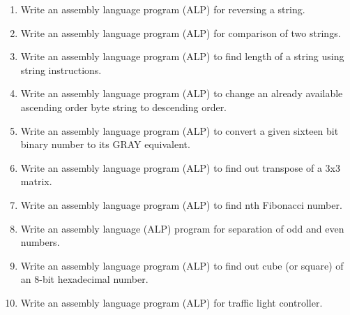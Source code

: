\documentclass[12pt, a4paper]{scrartcl}
\begin{document}
\begin{enumerate}
		\item Write an assembly language program (ALP) for reversing a string.
		\item Write an assembly language program (ALP) for comparison of two strings.
		\item Write an assembly language program (ALP) to find length of a string using string instructions.
		\item Write an assembly language program (ALP) to change an already available ascending order byte string to descending order.
		\item Write an assembly language program (ALP) to convert a given sixteen bit binary number to its GRAY equivalent.
		\item Write an assembly language program (ALP) to find out transpose of a 3x3 matrix.
		\item Write an assembly language program (ALP) to find nth Fibonacci number.
		\item Write an assembly language (ALP) program for separation of odd and even numbers.
		\item Write an assembly language program (ALP) to find out cube (or square) of an 8-bit hexadecimal number.
		\item Write an assembly language program (ALP) for traffic light controller.
	\end{enumerate}
\end{document}
